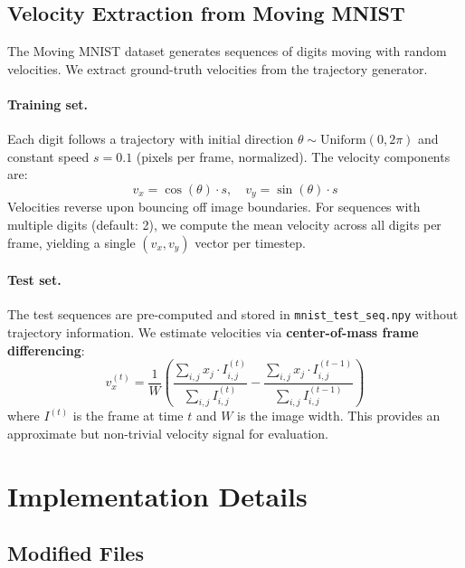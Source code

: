 \documentclass[11pt,a4paper]{article}
\begin{document}
\subsection{Velocity Extraction from Moving MNIST}
\label{sec:velocity_mnist}

The Moving MNIST dataset generates sequences of digits moving with random velocities. We extract ground-truth velocities from the trajectory generator.

\paragraph{Training set.}
Each digit follows a trajectory with initial direction $\theta \sim \text{Uniform}(0, 2\pi)$ and constant speed $s = 0.1$ (pixels per frame, normalized). The velocity components are:
\begin{equation}
    v_x = \cos(\theta) \cdot s, \quad v_y = \sin(\theta) \cdot s
\end{equation}
Velocities reverse upon bouncing off image boundaries. For sequences with multiple digits (default: 2), we compute the mean velocity across all digits per frame, yielding a single $(v_x, v_y)$ vector per timestep.

\paragraph{Test set.}
The test sequences are pre-computed and stored in \texttt{mnist\_test\_seq.npy} without trajectory information. We estimate velocities via \textbf{center-of-mass frame differencing}:
\begin{equation}
    v_x^{(t)} = \frac{1}{W} \left( \frac{\sum_{i,j} x_j \cdot I^{(t)}_{i,j}}{\sum_{i,j} I^{(t)}_{i,j}} - \frac{\sum_{i,j} x_j \cdot I^{(t-1)}_{i,j}}{\sum_{i,j} I^{(t-1)}_{i,j}} \right)
    \label{eq:com}
\end{equation}
where $I^{(t)}$ is the frame at time $t$ and $W$ is the image width. This provides an approximate but non-trivial velocity signal for evaluation.

\section{Implementation Details}
\label{sec:implementation}

\subsection{Modified Files}
\end{document}
